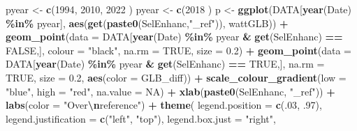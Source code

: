 \documentclass[
  10pt,
  a4paper,oneside]{article}
\newenvironment{Shaded}{\begin{snugshade}}{\end{snugshade}}
\newcommand{\AttributeTok}[1]{\textcolor[rgb]{0.13,0.29,0.53}{#1}}
\newcommand{\ConstantTok}[1]{\textcolor[rgb]{0.56,0.35,0.01}{#1}}
\newcommand{\DecValTok}[1]{\textcolor[rgb]{0.00,0.00,0.81}{#1}}
\newcommand{\FloatTok}[1]{\textcolor[rgb]{0.00,0.00,0.81}{#1}}
\newcommand{\FunctionTok}[1]{\textcolor[rgb]{0.13,0.29,0.53}{\textbf{#1}}}
\newcommand{\NormalTok}[1]{#1}
\newcommand{\OtherTok}[1]{\textcolor[rgb]{0.56,0.35,0.01}{#1}}
\newcommand{\SpecialCharTok}[1]{\textcolor[rgb]{0.81,0.36,0.00}{\textbf{#1}}}
\newcommand{\StringTok}[1]{\textcolor[rgb]{0.31,0.60,0.02}{#1}}
\begin{document}
\begin{Shaded}
\begin{Highlighting}[]
\NormalTok{pyear }\OtherTok{\textless{}{-}} \FunctionTok{c}\NormalTok{(}\DecValTok{1994}\NormalTok{, }\DecValTok{2010}\NormalTok{, }\DecValTok{2022}\NormalTok{ )}
\NormalTok{pyear }\OtherTok{\textless{}{-}} \FunctionTok{c}\NormalTok{(}\DecValTok{2018}\NormalTok{ )}
\NormalTok{p }\OtherTok{\textless{}{-}}
    \FunctionTok{ggplot}\NormalTok{(DATA[}\FunctionTok{year}\NormalTok{(Date) }\SpecialCharTok{\%in\%}\NormalTok{ pyear],}
           \FunctionTok{aes}\NormalTok{(}\FunctionTok{get}\NormalTok{(}\FunctionTok{paste0}\NormalTok{(SelEnhanc,}\StringTok{"\_ref"}\NormalTok{)), wattGLB)) }\SpecialCharTok{+}
    \FunctionTok{geom\_point}\NormalTok{(}\AttributeTok{data   =}\NormalTok{ DATA[}\FunctionTok{year}\NormalTok{(Date) }\SpecialCharTok{\%in\%}\NormalTok{ pyear }\SpecialCharTok{\&} \FunctionTok{get}\NormalTok{(SelEnhanc) }\SpecialCharTok{==} \ConstantTok{FALSE}\NormalTok{,],}
               \AttributeTok{colour =} \StringTok{"black"}\NormalTok{,}
               \AttributeTok{na.rm  =} \ConstantTok{TRUE}\NormalTok{,}
               \AttributeTok{size   =} \FloatTok{0.2}\NormalTok{) }\SpecialCharTok{+}
    \FunctionTok{geom\_point}\NormalTok{(}\AttributeTok{data   =}\NormalTok{ DATA[}\FunctionTok{year}\NormalTok{(Date) }\SpecialCharTok{\%in\%}\NormalTok{ pyear }\SpecialCharTok{\&} \FunctionTok{get}\NormalTok{(SelEnhanc) }\SpecialCharTok{==} \ConstantTok{TRUE}\NormalTok{,],}
               \AttributeTok{na.rm  =} \ConstantTok{TRUE}\NormalTok{,}
               \AttributeTok{size   =} \FloatTok{0.2}\NormalTok{,}
               \FunctionTok{aes}\NormalTok{(}\AttributeTok{color =}\NormalTok{ GLB\_diff)) }\SpecialCharTok{+}
    \FunctionTok{scale\_colour\_gradient}\NormalTok{(}\AttributeTok{low      =} \StringTok{"blue"}\NormalTok{,}
                          \AttributeTok{high     =} \StringTok{"red"}\NormalTok{,}
                          \AttributeTok{na.value =} \ConstantTok{NA}\NormalTok{) }\SpecialCharTok{+}
    \FunctionTok{xlab}\NormalTok{(}\FunctionTok{paste0}\NormalTok{(SelEnhanc, }\StringTok{"\_ref"}\NormalTok{)) }\SpecialCharTok{+}
    \FunctionTok{labs}\NormalTok{(}\AttributeTok{color =} \StringTok{"Over}\SpecialCharTok{\textbackslash{}n}\StringTok{reference"}\NormalTok{) }\SpecialCharTok{+}
    \FunctionTok{theme}\NormalTok{(}
        \AttributeTok{legend.position      =} \FunctionTok{c}\NormalTok{(.}\DecValTok{03}\NormalTok{, .}\DecValTok{97}\NormalTok{),}
        \AttributeTok{legend.justification =} \FunctionTok{c}\NormalTok{(}\StringTok{"left"}\NormalTok{, }\StringTok{"top"}\NormalTok{),}
        \AttributeTok{legend.box.just      =} \StringTok{"right"}\NormalTok{,}

\end{Highlighting}
\end{Shaded}
\end{document}
